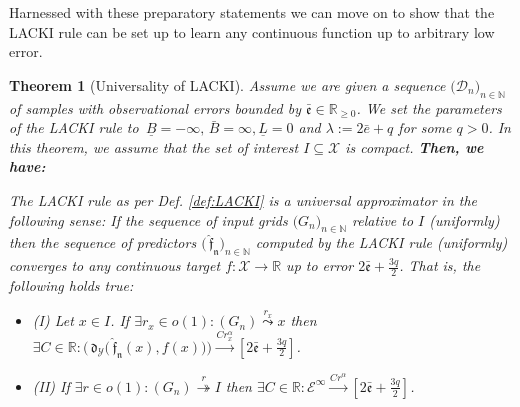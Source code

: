\documentclass{article} %
\newtheorem{thm}{Theorem}[section]
\theoremstyle{definition}
\theoremstyle{remark}
\newcommand{\Real}{\mathbb R}
\newcommand{\nat}{\mathbb N}
\newcommand{\data}{\ensuremath{ \mathcal D} }
\newcommand{\inspace}{\ensuremath{ \mathcal X}}
\newcommand{\outspace}{\ensuremath{ \mathcal Y}}
\newcommand{\grid}{\ensuremath{  G}}
\newcommand{\metric}{\, \mathfrak{d}} %
\newcommand{\Metrico}[2]{\metric_\outspace\bigl(#1,#2\bigr) }
\newcommand{\predfn}{\, \mathfrak{  \hat f_n}} %
\newcommand{\hexp}{{ \alpha }}%
\newcommand{\hestthresh}{\ensuremath{ \lambda}}
\newcommand{\ubf}{\, {\bar B}} %
\newcommand{\lbf}{\, {\underline{B}}} %
\newcommand{\obserrbnd}{\bar{\mathfrak e}}
\newcommand{\seq}[2]{\ensuremath{\bigl(#1\bigr)_{#2}}}
\newcommand{\convto}{\longrightarrow}
\newcommand{\bd}{\leadsto} %
\newcommand{\bdu}{\twoheadrightarrow} %
\newcommand{\errmetric}{\mathcal E} %
\begin{document}
Harnessed with these preparatory statements we can move on to show that the LACKI rule can be set up to learn any continuous function up to arbitrary low error.
\begin{thm}[Universality of LACKI]
\label{thm:LACKIuniversality}
Assume we are given a sequence $\seq{\data_n}{n \in \nat}$ of samples with observational errors bounded by $\obserrbnd \in \Real_{\geq 0}$. We set the parameters of the LACKI rule to $\lbf =-\infty,\ubf =\infty, \underline L =0$ and $\hestthresh := 2 \bar e +q $ for some $q >0$. In this theorem, we assume that the set of interest $I \subseteq\inspace$ is compact.
\textbf{Then, we have:}

The LACKI rule as per Def. \ref{def:LACKI} is a universal approximator in the following sense:
If the sequence of input grids $\seq{\grid_n}{n \in \nat}$ relative to $I$ (uniformly) then the sequence of predictors $\seq{\predfn}{n \in \nat}$ computed by the LACKI rule (uniformly) converges to any continuous target $f : \inspace \to \Real$ up to error $2 \obserrbnd + \frac{3q}{2}$.
That is, the following holds true:



\begin{itemize}
\item (I) Let $x \in I$. If $\exists r_x \in o(1): (\grid_n) \stackrel{ r_x}{\bd} x$ then $\exists C \in \Real : \seq{\Metrico{\predfn(x)}{f(x)}}{ } \stackrel{C r_x^\hexp}{\convto}[2\obserrbnd + \frac{3q}{2}]$.
\item (II) If $\exists r \in o(1): (\grid_n) \stackrel{ r}{\bdu} I$ then $\exists C \in \Real : {\errmetric^\infty}{ } \stackrel{C r^\hexp}{\convto}[2\obserrbnd + \frac{3q}{2}]$.
\end{itemize}
\end{thm}
\end{document}
